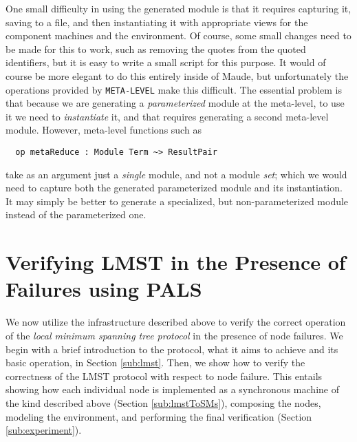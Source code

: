 \documentclass[copyright,creativecommons]{eptcs}
\begin{document}
One small difficulty in using the generated module is that it requires
capturing it, saving to a file, and then instantiating it with appropriate
views for the component machines and the environment. Of course, some small
changes need to be made for this to work, such as removing the quotes from the
quoted identifiers, but it is easy to write a small script for this purpose. It
would of course be more elegant to do this entirely inside of Maude, but
unfortunately the operations provided by {\tt META-LEVEL} make this difficult.
The essential problem is that because we are generating a \emph{parameterized}
module at the meta-level, to use it we need to \emph{instantiate} it, and that
requires generating a second meta-level module.  However, meta-level functions
such as

\begin{center}
\begin{small}
\begin{boxedminipage}{0.60\textwidth}
\begin{verbatim}
  op metaReduce : Module Term ~> ResultPair
\end{verbatim}
\end{boxedminipage}
\end{small}
\end{center}

\noindent
take as an argument just a \emph{single} module, and not a module \emph{set};
which we would need to capture both the generated parameterized module and its
instantiation. It may simply be better to generate a specialized, but
non-parameterized module instead of the parameterized one.

\section{Verifying LMST in the Presence of Failures using PALS}
\label{sec:lmst}

We now utilize the infrastructure described above to verify the correct
operation of the \emph{local minimum spanning tree protocol} \cite{li_2003_01}
in the presence of node failures. We begin with a brief introduction to the
protocol, what it aims to achieve and its basic operation, in Section
\ref{sub:lmst}. Then, we show how to verify the correctness of the LMST
protocol with respect to node failure. This entails showing how each individual
node is implemented as a synchronous machine of the kind described above
(Section \ref{sub:lmstToSMs}), composing the nodes, modeling the environment,
and performing the final verification (Section \ref{sub:experiment}).
\end{document}
